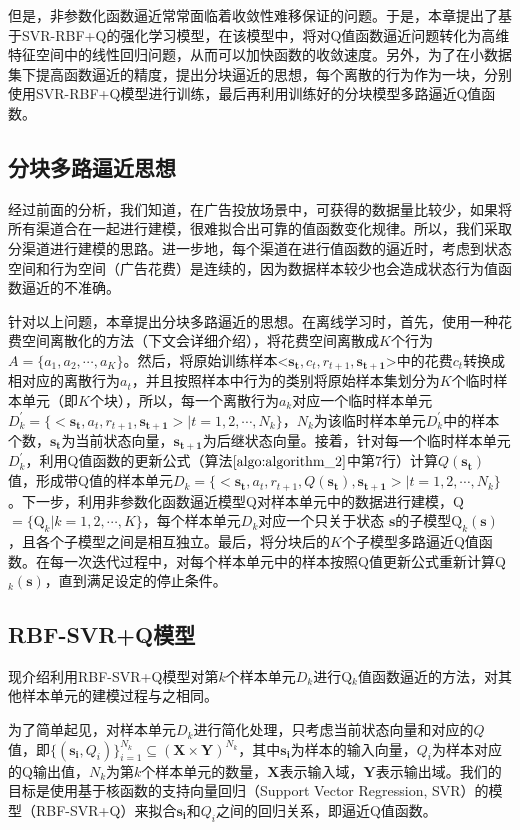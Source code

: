 但是，非参数化函数逼近常常面临着收敛性难移保证的问题。于是，本章提出了基于SVR-RBF+Q的强化学习模型，在该模型中，将对Q值函数逼近问题转化为高维特征空间中的线性回归问题，从而可以加快函数的收敛速度。另外，为了在小数据集下提高函数逼近的精度，提出分块逼近的思想，每个离散的行为作为一块，分别使用SVR-RBF+Q模型进行训练，最后再利用训练好的分块模型多路逼近Q值函数。

\subsection{分块多路逼近思想}
经过前面的分析，我们知道，在广告投放场景中，可获得的数据量比较少，如果将所有渠道合在一起进行建模，很难拟合出可靠的值函数变化规律。所以，我们采取分渠道进行建模的思路。进一步地，每个渠道在进行值函数的逼近时，考虑到状态空间和行为空间（广告花费）是连续的，因为数据样本较少也会造成状态行为值函数逼近的不准确。

针对以上问题，本章提出分块多路逼近的思想。在离线学习时，首先，使用一种花费空间离散化的方法（下文会详细介绍），将花费空间离散成$K$个行为$A=\{a_{1},a_{2},\cdots,a_{K}\}$。然后，将原始训练样本<$\mathbf{s_{t}},c_{t},r_{t+1},\mathbf{s_{t+1}}$>中的花费$c_{t}$转换成相对应的离散行为$a_{t}$，并且按照样本中行为的类别将原始样本集划分为$K$个临时样本单元（即$K$个块），所以，每一个离散行为$a_{k}$对应一个临时样本单元$D_{k}^{'}=\{<\mathbf{s_{t}},a_{t},r_{t+1},\mathbf{s_{t+1}}>|t=1,2,\cdots,N_{k}\}$，$N_{k}$为该临时样本单元$D_{k}^{'}$中的样本个数，$\mathbf{s_{t}}$为当前状态向量，$\mathbf{s_{t+1}}$为后继状态向量。接着，针对每一个临时样本单元$D_{k}^{'}$，利用Q值函数的更新公式（算法$\ref{algo:algorithm_2}$中第7行）计算$Q(\mathbf{s_{t}})$值，形成带Q值的样本单元$D_{k}=\{<\mathbf{s_{t}},a_{t},r_{t+1},Q(\mathbf{s_{t}}),\mathbf{s_{t+1}}>|t=1,2,\cdots,N_{k}\}$。下一步，利用非参数化函数逼近模型Q对样本单元中的数据进行建模，Q$=\{\text{Q}_{k}|k=1,2,\cdots,K\}$，每个样本单元$D_{k}$对应一个只关于状态 $\mathbf{s}$的子模型$\text{Q}_{k}(\mathbf{s})$，且各个子模型之间是相互独立。最后，将分块后的$K$个子模型多路逼近Q值函数。在每一次迭代过程中，对每个样本单元中的样本按照Q值更新公式重新计算Q$_{k}(\mathbf{s})$，直到满足设定的停止条件。

\subsection{RBF-SVR+Q模型}
现介绍利用RBF-SVR+Q模型对第$k$个样本单元$D_{k}$进行Q$_{k}$值函数逼近的方法，对其他样本单元的建模过程与之相同。

为了简单起见，对样本单元$D_{k}$进行简化处理，只考虑当前状态向量和对应的$Q$值，即$\{(\mathbf{s_{i}}, Q_{i})\}_{i=1}^{N_{k}}\subseteq(\mathbf{X} \times \mathbf{Y})^{N_{k}}$，其中$\mathbf{s_{i}}$为样本的输入向量，$Q_{i}$为样本对应的Q输出值，$N_{k}$为第$k$个样本单元的数量，$\mathbf{X}$表示输入域，$\mathbf{Y}$表示输出域。我们的目标是使用基于核函数的支持向量回归（Support Vector Regression, SVR）的模型（RBF-SVR+Q）来拟合$\mathbf{s_{i}}$和$Q_{i}$之间的回归关系，即逼近Q值函数。


